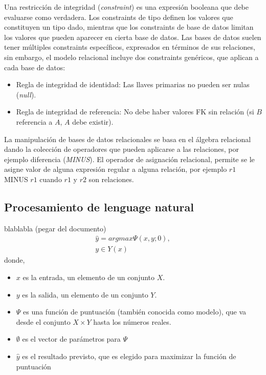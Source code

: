 \documentclass[letterpaper]{article}
\begin{document}
Una restricción de integridad (\emph{constraint}) es una expresión booleana que debe evaluarse como verdadera. Los constraints de tipo definen los valores que constituyen un tipo dado, mientras que los constraints de base de datos limitan los valores que pueden aparecer en cierta base de datos. Las bases de datos suelen tener múltiples constraints específicos, expresados en términos de sus relaciones, sin embargo, el modelo relacional incluye dos constraints genéricos, que aplican a cada base de datos:
\begin{itemize}
    \item Regla de integridad de identidad: Las llaves primarias no pueden ser nulas (\emph{null}).
    \item Regla de integridad de referencia: No debe haber valores FK sin relación (si $B$ referencia a $A$, $A$ debe existir).
\end{itemize}

La manipulación de bases de datos relacionales se basa en el álgebra relacional dando la colección de operadores que pueden aplicarse a las relaciones, por ejemplo diferencia (\emph{MINUS}). El operador de asignación relacional, permite se le asigne valor de alguna expresión regular a alguna relación, por ejemplo $r1$ MINUS $r1$ cuando $r1$ y $r2$ son relaciones.
\subsection {Procesamiento de lenguage natural}
blablabla (pegar del documento)\\
\begin{equation}
\begin{matrix}
\hat{y}=argmax\Psi(x,y;0),\\
y\in Y(x)
\end{matrix}
\end{equation}
donde,
\begin{itemize}
    \item $x$ es la entrada, un elemento de un conjunto $X$.
    \item $y$ es la salida, un elemento de un conjunto $Y$.
    \item $\Psi$ es una función de puntuación (también conocida como modelo), que va desde el conjunto $X\times Y$ hasta los números reales.
    \item $\emptyset$ es el vector de parámetros para $\Psi$
    \item $\hat{y}$ es el resultado previsto, que es elegido para maximizar la función de puntuación
\end{itemize}
\end{document}
